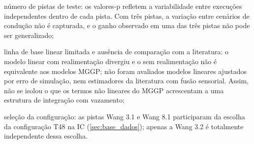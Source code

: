 \begin{alineas}
    \item número de pistas de teste: os valores-p refletem a variabilidade entre execuções independentes dentro de cada pista. Com três pistas, a variação entre cenários de condução não é capturada, e o ganho observado em uma das três pistas não pode ser generalizado;
    \item linha de base linear limitada e ausência de comparação com a literatura: o modelo linear com realimentação divergiu e o sem realimentação não é equivalente aos modelos MGGP; não foram avaliados modelos lineares ajustados por erro de simulação, nem estimadores da literatura com fusão sensorial. Assim, não se isolou o que os termos não lineares do MGGP acrescentam a uma estrutura de integração com vazamento;
    \item seleção da configuração: as pistas Wang 3.1 e Wang 8.1 participaram da escolha da configuração T48 na IC (\autoref{sec:base_dados}); apenas a Wang 3.2 é totalmente independente dessa escolha.
\end{alineas}
